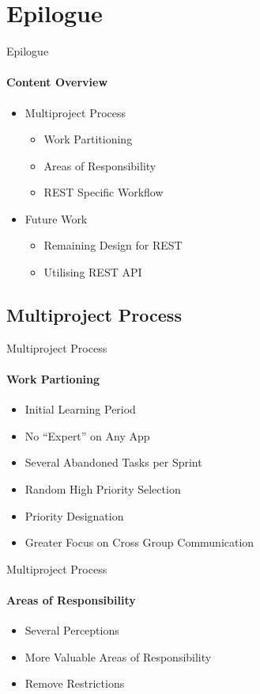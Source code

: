 \section{Epilogue}
    \begin{frame}[t]{Epilogue}\framesubtitle{Content Overview}
        \begin{itemize}
            \item Multiproject Process
            \begin{itemize}
                \item Work Partitioning
                \item Areas of Responsibility
                \item REST Specific Workflow
            \end{itemize}
            \item Future Work
            \begin{itemize}
                \item Remaining Design for REST
                \item Utilising REST API
            \end{itemize}
        \end{itemize}
    \end{frame}

    \subsection{Multiproject Process}
    \begin{frame}[t]{Multiproject Process}\framesubtitle{Work Partioning}  
        \begin{itemize}
            \item Initial Learning Period
            \item No ``Expert'' on Any App
            \item Several Abandoned Tasks per Sprint
            \item Random High Priority Selection
            \item Priority Designation
            \item Greater Focus on Cross Group Communication
        \end{itemize}
    \end{frame}

    \begin{frame}[t]{Multiproject Process}\framesubtitle{Areas of Responsibility}
        \begin{itemize}
            \item Several Perceptions
            \item More Valuable Areas of Responsibility
            \item Remove Restrictions
        \end{itemize}
    \end{frame}

